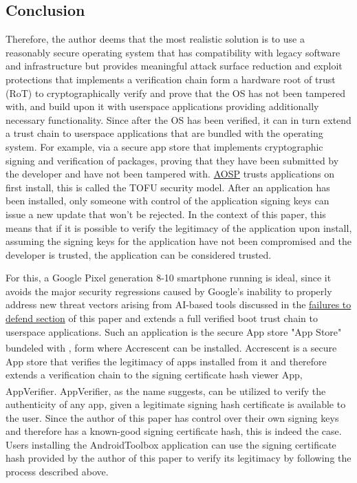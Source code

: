 \documentclass[a4paper,12pt]{report}
\begin{document}
\subsection{Conclusion}
Therefore, the author deems that the most realistic solution is to use a reasonably secure operating system that has compatibility with legacy software and infrastructure but provides meaningful attack surface reduction and exploit protections that implements a verification chain form a hardware root of trust (RoT) to cryptographically verify and prove that the OS has not been tampered with, and build upon it with userspace applications providing additionally necessary functionality. Since after the OS has been verified, it can in turn extend a trust chain to userspace applications that are bundled with the operating system.
For example, via a secure app store that implements cryptographic signing and verification of packages, proving that they have been submitted by the developer and have not been tampered with. \hyperref[aosp]{AOSP} trusts applications on first install, this is called the TOFU security model. After an application has been installed, only someone with control of the application signing keys can issue a new update that won't be rejected. In the context of this paper, this means that if it is possible to verify the legitimacy of the application upon install, assuming the signing keys for the application have not been compromised and the developer is trusted, the application can be considered trusted. 

For this, a Google Pixel generation 8-10 smartphone running \citeauthor{grapheneos} is ideal, since it avoids the major security regressions caused by Google's inability to properly address new threat vectors arising from AI-based tools discussed in the \hyperref[google-failure]{failures to defend section} of this paper and extends a full verified boot trust chain to userspace applications. Such an application is the secure App store "App Store" bundeled with \citeauthor{grapheneos}, form where Accrescent\textsuperscript{\citep{accrescent}} can be installed. Accrescent is a secure App store that verifies the legitimacy of apps installed from it and therefore extends a verification chain to the signing certificate hash viewer App, AppVerifier\textsuperscript{\citep{appverifier}}. 
AppVerifier, as the name suggests, can be utilized to verify the authenticity of any app, given a legitimate signing hash certificate is available to the user. Since the author of this paper has control over their own signing keys and therefore has a known-good signing certificate hash, this is indeed the case. Users installing the AndroidToolbox application can use the signing certificate hash provided by the author of this paper to verify its legitimacy by following the process described above. 
\end{document}
